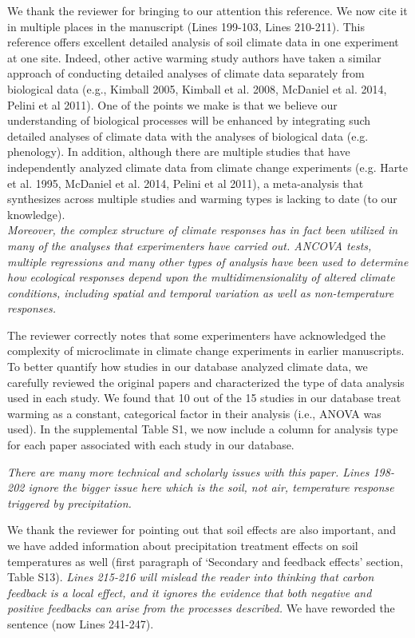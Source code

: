 \documentclass[11pt,a4paper]{letter}
\begin{document}
\begin{letter}{}
We thank the reviewer for bringing to our attention this reference. We now cite it in multiple places in the manuscript (Lines 199-103, Lines 210-211). This reference offers excellent detailed analysis of soil climate data in one experiment at one site. Indeed, other active warming study authors have taken a similar approach of conducting detailed analyses of climate data separately from biological data (e.g., Kimball 2005, Kimball et al. 2008, McDaniel et al. 2014, Pelini et al 2011). One of the points we make is that we believe our understanding of biological processes will be enhanced by integrating such detailed analyses of climate data with the analyses of biological data (e.g. phenology). In addition, although there are multiple studies that have independently analyzed climate data from climate change experiments (e.g. Harte et al. 1995, McDaniel et al. 2014, Pelini et al 2011), a meta-analysis that synthesizes across multiple studies and warming types is lacking to date (to our knowledge).\\

\emph{Moreover, the complex structure of climate responses has in fact been utilized in many of the analyses that experimenters have carried out.  ANCOVA tests, multiple regressions and many other types of analysis have been used to determine how ecological responses depend upon the multidimensionality of altered climate conditions, including spatial and temporal variation as well as non-temperature responses.}

The reviewer correctly notes that some experimenters have acknowledged the complexity of microclimate in climate change experiments in earlier manuscripts. To better quantify how studies in our database analyzed climate data, we carefully reviewed the original papers and characterized the type of data analysis used in each study. We found that 10 out of the 15 studies in our database treat warming as a constant, categorical factor in their analysis (i.e., ANOVA was used). In the supplemental Table S1,   
we now include a column for analysis type for each paper associated with each study in our database. 
\par \emph{There are many more technical and scholarly issues with this paper.  Lines 198-202 ignore the bigger issue here which is the soil, not air, temperature response triggered by precipitation.}
\par We thank the reviewer for pointing out that soil effects are also important, and we have added information about precipitation treatment effects on soil temperatures as well (first paragraph of `Secondary and feedback effects' section, Table S13).
\emph  {Lines 215-216 will mislead the reader into thinking that carbon feedback is a local effect, and it ignores the evidence that both negative and positive feedbacks can arise from the processes described.}  
We have reworded the sentence (now Lines 241-247).


\end{letter}
\end{document}
